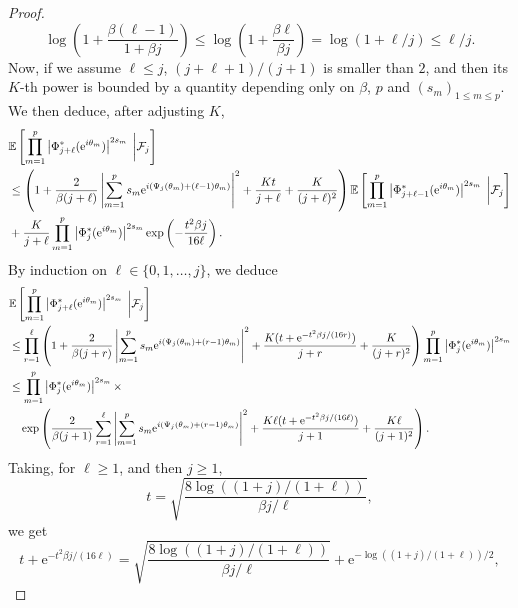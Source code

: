 \documentclass[10pt,a4paper]{amsart}
\begin{document}
\begin{proof}
$$\log \left(1 + \frac{\beta(\ell-1)}{1 + \beta j} \right) \leq  \log \left(1 + \frac{\beta \ell}{ \beta j} \right) = \log (1 + \ell/j) \leq \ell/j.$$
Now, if we assume $\ell \leq j$, 
$(j+\ell+1)/(j+1)$ is smaller than $2$, and then 
its $K$-th power is bounded by a quantity depending only on $\beta$, $p$
and $(s_m)_{1 \leq m \leq p}$. We then deduce, after adjusting $K$, 
\begin{align*}
& \mathbb{E} \left[ \prod_{m=1}^p \left|\Phi^*_{j+\ell} (\mathrm{e}^{\textnormal{i} \theta_m})
\right|^{2s_m} \;  \bigg| \mathcal{F}_j \right]
\\ & \leq 
 \left(1 + \frac{2}{ \beta(j+\ell)} \left|\sum_{m=1}^{p} s_m \mathrm{e}^{\textnormal{i} (\Psi_{j} (\theta_m) + (\ell-1) \theta_m) }\right|^2
 +\frac{Kt}{j+\ell} + \frac{K}{(j+\ell)^2}\right) 
 \mathbb{E} \left[ \prod_{m=1}^p \left|\Phi^*_{j+\ell-1} (\mathrm{e}^{\textnormal{i} \theta_m})
\right|^{2s_m} \;  \bigg| \mathcal{F}_j \right]
\\ & + \frac{K}{j+\ell}
\prod_{m=1}^p \left|\Phi^*_{j} (\mathrm{e}^{\textnormal{i} \theta_m})
\right|^{2s_m}  \exp \left( - \frac{t^2  \beta j}{16 \ell}\right).
\end{align*}
By induction on $\ell \in \{0,1,\dots, j\}$, we deduce
\begin{align*}
& \mathbb{E} \left[ \prod_{m=1}^p \left|\Phi^*_{j+\ell} (\mathrm{e}^{\textnormal{i} \theta_m})
\right|^{2s_m} \;  \bigg| \mathcal{F}_j \right]
\\ & \leq 
\prod_{r = 1}^{\ell} \left(1 + \frac{2}{ \beta(j+r)} \left|\sum_{m=1}^{p} s_m \mathrm{e}^{\textnormal{i} (\Psi_{j} (\theta_m) + (r-1) \theta_m) }\right|^2
 +\frac{K (t + \mathrm{e}^{-t^2 \beta j/(16 r)})}{j+r} + \frac{K}{(j+r)^2}\right) 
 \prod_{m=1}^p \left|\Phi^*_{j} (\mathrm{e}^{\textnormal{i} \theta_m})
\right|^{2s_m}
\\ & \leq \prod_{m=1}^p \left|\Phi^*_{j} (\mathrm{e}^{\textnormal{i} \theta_m})
\right|^{2s_m} \times \\  
&\ \ \ \exp \left( 
\frac{2}{\beta (j+1)} \sum_{r = 1}^{\ell}
\left|\sum_{m=1}^{p} s_m \mathrm{e}^{\textnormal{i} (\Psi_{j} (\theta_m) + (r-1) \theta_m) }\right|^2 
+ \frac{K \ell (t + \mathrm{e}^{-t^2 \beta j/(16 \ell)})}{j+1}
+ \frac{K \ell}{(j+1)^2}
\right).
\end{align*}
Taking, for $\ell \geq 1$, and then $j \geq 1$, $$t = \sqrt{\frac{ 8 \log ((1+j)/(1+\ell))}{\beta j/\ell}},$$
we get 
$$t + \mathrm{e}^{-t^2 \beta j/(16 \ell)} 
= \sqrt{\frac{ 8 \log ((1+j)/(1+\ell))}{\beta j/\ell}}
+ \mathrm{e}^{- \log ((1+j)/(1+\ell)) / 2},$$

\end{proof}
\end{document}
